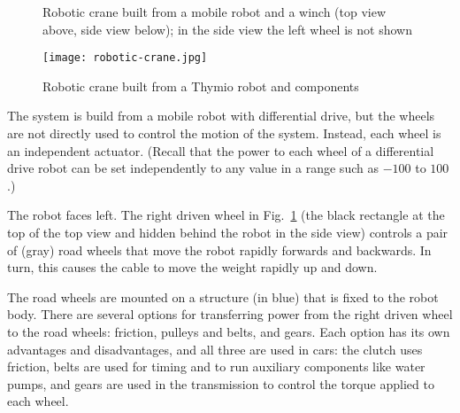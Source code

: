 \begin{figure}
\begin{center}
\caption{Robotic crane built from a mobile robot and a winch (top view above, side view below); in the side view the left wheel is not shown}\label{fig.act-dof}
\end{center}
\end{figure}

\begin{figure}
\begin{center}
\texttt{[image: robotic-crane.jpg]}
\caption{Robotic crane built from a Thymio robot and \lego{} components}\label{fig.crane}
\end{center}
\end{figure}

The system is build from a mobile robot with differential drive, but the wheels are not directly used to control the motion of the system. Instead, each wheel is an independent actuator. (Recall that the power to each wheel of a differential drive robot can be set independently to any value in a range such as $-100$ to $100$.)

The robot faces left. The right driven wheel in Fig.~\ref{fig.act-dof} (the black rectangle at the top of the top view and hidden behind the robot in the side view) controls a pair of (gray) road wheels that move the robot rapidly forwards and backwards. In turn, this causes the cable to move the weight rapidly up and down.

The road wheels are mounted on a structure (in blue) that is fixed to the robot body. There are several options for transferring power from the right driven wheel to the road wheels: friction, pulleys and belts, and gears. Each option has its own advantages and disadvantages, and all three are used in cars: the clutch uses friction, belts are used for timing and to run auxiliary components like water pumps, and gears are used in the transmission to control the torque applied to each wheel.

